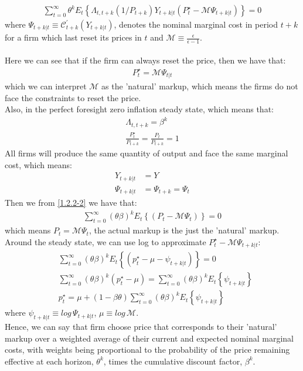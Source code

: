 \documentclass{article}
\numberwithin{equation}{section}
\begin{document}
	\begin{align}
		\sum\limits^\infty_{t=0} \theta^k E_t\left\{\Lambda_{t,t+k} (1/P_{t+k}) Y_{t+k|t} (P^\star_t - \mathscr{M} \Psi_{t+k|t}) \right\} = 0 \label{1.2.2-2}
	\end{align}
where $\Psi_{t+k|t} \equiv \mathscr{C}^\prime_{t+k}(Y_{t+k|t})$, denotes the nominal marginal cost in period $t+k$ for a firm which last reset its prices in $t$ and $\mathscr{M} \equiv \frac{\epsilon}{\epsilon-1}$.\\\\
Here we can see that if the firm can always reset the price, then we have that:
	\begin{align*}
		P^\star_t = \mathscr{M} \Psi_{t|t}
	\end{align*}
which we can interpret $\mathscr{M}$ as the 'natural' markup, which means the firms do not face the constraints to reset the price.\\
Also, in the perfect foresight zero inflation steady state, which means that:
	\begin{align*}
		\Lambda_{t,t+k} = \beta^k\\
		\frac{P^\star_t}{P_{t+k}} = \frac{P_{t}}{P_{t+k}} = 1
	\end{align*} 
All firms will produce the same quantity of output and face the same marginal cost, which means:
	\begin{align*}
		Y_{t+k|t} &= Y\\
		\Psi_{t+k|t} &= \Psi_{t+k} = \Psi_t
	\end{align*}
Then we from \eqref{1.2.2-2} we have that:
	\begin{align*}
		\sum\limits^\infty_{t=0} (\theta \beta)^k E_t\left\{(P_t - \mathscr{M} \Psi_{t}) \right\} = 0
	\end{align*}
which means $P_t = \mathscr{M} \Psi_{t}$, the actual markup is the just the 'natural' markup.\\
Around the steady state, we can use log to approximate $P^\star_t - \mathscr{M} \Psi_{t+k|t}$:
	\begin{align}
		&\sum\limits^\infty_{t=0} (\theta \beta)^k E_t\left\{(p^\star_t - \mu - \psi_{t+k|t}) \right\} = 0 \nonumber\\
		 &\sum\limits^\infty_{t=0} (\theta \beta)^k(p^\star_t - \mu) = \sum\limits^\infty_{t=0} (\theta \beta)^k E_t\left\{\psi_{t+k|t} \right\} \nonumber\\
		 &p^\star_t = \mu + (1 - \beta \theta)\sum\limits^\infty_{t=0} (\theta \beta)^k E_t\left\{\psi_{t+k|t} \right\} \label{1.2.2-3}
	\end{align}
where $\psi_{t+k|t} \equiv log\,\Psi_{t+k|t}$, $\mu \equiv log\,\mathscr{M}$.\\
Hence, we can say that firm choose price that corresponds to their 'natural' markup over a weighted average of their current and expected nominal marginal costs, with weights being proportional to the probability of the price remaining effective at each horizon, $\theta^k$, times the cumulative discount factor, $\beta^k$.
\end{document}
